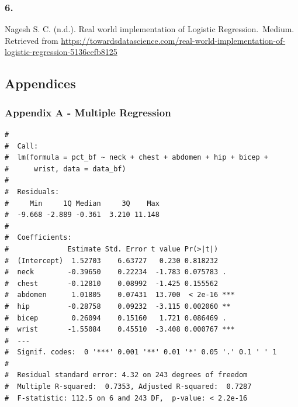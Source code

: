 \documentclass[a4paper,9pt,twocolumn,twoside,]{pinp}
\begin{document}
\hypertarget{section-5}{%
\subsubsection{6.}\label{section-5}}

Nagesh S. C. (n.d.). Real world implementation of Logistic
Regression.~Medium. Retrieved from
\url{https://towardsdatascience.com/real-world-implementation-of-logistic-regression-5136cefb8125}

\hypertarget{appendices}{%
\subsection{Appendices}\label{appendices}}

\hypertarget{appendix-a---multiple-regression}{%
\subsubsection{Appendix A - Multiple
Regression}\label{appendix-a---multiple-regression}}

\begin{Shaded}
\begin{Highlighting}[]
\StringTok{ }\OperatorTok{~}
\StringTok{ } \NormalTok{,} \NormalTok{)}
\end{Highlighting}
\end{Shaded}

\begin{ShadedResult}
\begin{verbatim}
#  
#  Call:
#  lm(formula = pct_bf ~ neck + chest + abdomen + hip + bicep + 
#      wrist, data = data_bf)
#  
#  Residuals:
#     Min     1Q Median     3Q    Max 
#  -9.668 -2.889 -0.361  3.210 11.148 
#  
#  Coefficients:
#              Estimate Std. Error t value Pr(>|t|)    
#  (Intercept)  1.52703    6.63727   0.230 0.818232    
#  neck        -0.39650    0.22234  -1.783 0.075783 .  
#  chest       -0.12810    0.08992  -1.425 0.155562    
#  abdomen      1.01805    0.07431  13.700  < 2e-16 ***
#  hip         -0.28758    0.09232  -3.115 0.002060 ** 
#  bicep        0.26094    0.15160   1.721 0.086469 .  
#  wrist       -1.55084    0.45510  -3.408 0.000767 ***
#  ---
#  Signif. codes:  0 '***' 0.001 '**' 0.01 '*' 0.05 '.' 0.1 ' ' 1
#  
#  Residual standard error: 4.32 on 243 degrees of freedom
#  Multiple R-squared:  0.7353, Adjusted R-squared:  0.7287 
#  F-statistic: 112.5 on 6 and 243 DF,  p-value: < 2.2e-16
\end{verbatim}
\end{ShadedResult}
\end{document}
